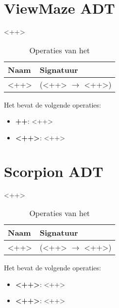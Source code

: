 \section{View\textunderscore Maze ADT}
\label{section:view_level}

<++>

\begin{table}[hbt]
\centering
\begin{tabular}{|ll|}
\hline
\rowcolor[HTML]{000000} 
{\color[HTML]{FFFFFF} \textbf{Naam}} & {\color[HTML]{FFFFFF} \textbf{Signatuur}} \\ \hline
<++>                                 & (<++> $\rightarrow$ <++>)                                       \\ \hline
\end{tabular}
\caption{Operaties van het \texttt{}}
\label{table:view_level}
\end{table}

Het \texttt{} bevat de volgende operaties:

\begin{itemize}
	\item \textbf{++}: <++>
	\item \textbf{<++>}: <++>
\end{itemize}

\section{Scorpion ADT}
\label{section:scorpion}

<++>

\begin{table}[hbt]
\centering
\begin{tabular}{|ll|}
\hline
\rowcolor[HTML]{000000} 
{\color[HTML]{FFFFFF} \textbf{Naam}} & {\color[HTML]{FFFFFF} \textbf{Signatuur}} \\ \hline
<++>                                 & (<++> $\rightarrow$ <++>)                                       \\ \hline
\end{tabular}
\caption{Operaties van het \texttt{}}
\label{table:scorpion}
\end{table}

Het \texttt{} bevat de volgende operaties:

\begin{itemize}
	\item \textbf{<++>}: <++>
	\item \textbf{<++>}: <++>
\end{itemize}

